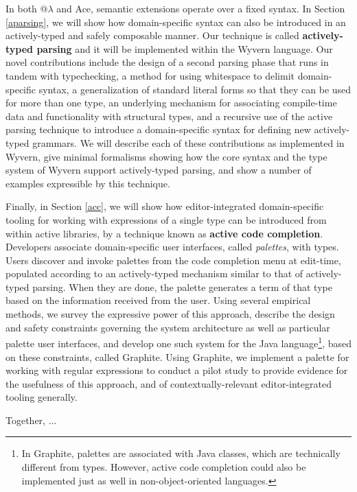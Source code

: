 In both @$\lambda$ and Ace, semantic extensions operate over a fixed syntax. In Section \ref{aparsing}, we will show how domain-specific syntax can also be introduced in an actively-typed and safely composable manner. Our technique is called \textbf{actively-typed parsing} and it will be implemented within the Wyvern language. Our novel contributions include the design of a second parsing phase that runs in tandem with typechecking, a method for using whitespace to delimit domain-specific syntax, a generalization of standard literal forms so that they can be used for more than one type, an underlying mechanism for associating compile-time data and functionality with structural types, and a recursive use of the active parsing technique to introduce a domain-specific syntax for defining new actively-typed grammars. We will describe each of these contributions as implemented in Wyvern, give minimal formalisms showing how the core syntax and the type system of Wyvern support actively-typed parsing,  and show a number of examples expressible by this technique.

Finally, in Section \ref{acc}, we will show how editor-integrated domain-specific tooling for working with expressions of a single type can be introduced from within active libraries, by a technique known as \textbf{active code completion}. Developers associate
domain-specific user interfaces, called \emph{palettes}, with types. Users discover and invoke palettes from the code completion menu at edit-time, populated according to an actively-typed mechanism similar to that of actively-typed parsing. When they are done, the palette generates a term of that type based on the information received from the user. Using several empirical
methods, we survey\- the expressive power of this approach, describe the design and safety constraints governing
the system architecture as well as particular palette user 
interfaces, and develop one such system for the Java language\footnote{In Graphite, palettes are associated with Java classes, which are technically different from types. However, active code completion could also be implemented just as well in non-object-oriented languages.}, based on these constraints, called Graphite. Using Graphite,
we implement a palette for working with regular expressions to conduct a pilot study to provide evidence for the usefulness of this approach, and of contextually-relevant editor-integrated tooling generally.

Together, ...

